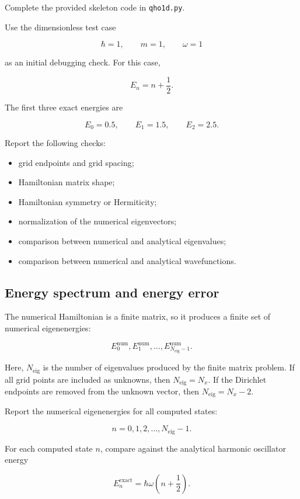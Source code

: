 Complete the provided skeleton code in \texttt{qho1d.py}.

Use the dimensionless test case

\[
\hbar=1,
\qquad
m=1,
\qquad
\omega=1
\]

as an initial debugging check. For this case,

\[
E_n
=
n+\frac{1}{2}.
\]

The first three exact energies are

\[
E_0=0.5,
\qquad
E_1=1.5,
\qquad
E_2=2.5.
\]

Report the following checks:

\begin{itemize}
    \item grid endpoints and grid spacing;
    \item Hamiltonian matrix shape;
    \item Hamiltonian symmetry or Hermiticity;
    \item normalization of the numerical eigenvectors;
    \item comparison between numerical and analytical eigenvalues;
    \item comparison between numerical and analytical wavefunctions.
\end{itemize}

\subsection{Energy spectrum and energy error}

The numerical Hamiltonian is a finite matrix, so it produces a finite set of numerical eigenenergies:

\[
E_0^{\mathrm{num}},
E_1^{\mathrm{num}},
\dots,
E_{N_{\mathrm{eig}}-1}^{\mathrm{num}}.
\]

Here, \(N_{\mathrm{eig}}\) is the number of eigenvalues produced by the finite matrix problem. If all grid points are included as unknowns, then \(N_{\mathrm{eig}}=N_x\). If the Dirichlet endpoints are removed from the unknown vector, then \(N_{\mathrm{eig}}=N_x-2\).

Report the numerical eigenenergies for all computed states:

\[
n=0,1,2,\ldots,N_{\mathrm{eig}}-1.
\]

For each computed state \(n\), compare against the analytical harmonic oscillator energy

\[
E_n^{\mathrm{exact}}
=
\hbar\omega
\left(n+\frac12\right).
\]

